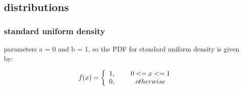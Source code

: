 \documentclass{beamer}
\begin{document}
\begin{frame}
\begin{figure}
\end{figure}
\end{frame}







\subsection{distributions}
\begin{frame}\frametitle{standard uniform density}
	parameters a = 0 and b = 1, so the PDF for standard uniform density is given by:
	
	\begin{align}
		f(x) = \left\{ \begin{array}{cc} 
		1, & \hspace{5mm} 0 <= x <=1 \\
		0, & \hspace{5mm} otherwise \\
		\end{array} \right.
	\end{align}
	
\end{frame}
\end{document}
